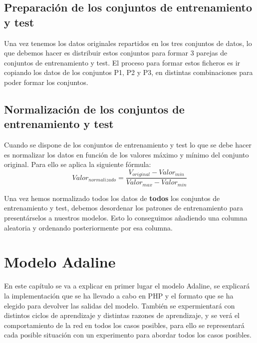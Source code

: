 \documentclass[11pt,spanish,listoffigures,listoftables]{workluis}
\begin{document}
\section{Preparación de los conjuntos de entrenamiento y test}

\par Una vez tenemos los datos originales repartidos en los tres conjuntos de datos, lo que debemos hacer es distribuir estos conjuntos para formar 3 parejas de conjuntos de entrenamiento y test. El proceso para formar estos ficheros es ir copiando los datos de los conjuntos P1, P2 y P3, en distintas combinaciones para poder formar los conjuntos.

\section{Normalización de los conjuntos de entrenamiento y test}

\par Cuando se dispone de los conjuntos de entrenamiento y test lo que se debe hacer es normalizar los datos en función de los valores máximo y mínimo del conjunto original. Para ello se aplica la siguiente fórmula:
\begin{equation}\label{eq:ej}
Valor_{normalizado} = \frac{V_{original} - Valor_{min}}{Valor_{max} - Valor_{min}}
\end{equation}

\par Una vez hemos normalizado todos los datos de \textbf{todos} los conjuntos de entrenamiento y test, debemos desordenar los patrones de entrenamiento para presentárselos a nuestros modelos. Esto lo conseguimos añadiendo una columna aleatoria y ordenando posteriormente por esa columna.

\chapter{Modelo Adaline}

\par En este capítulo se va a explicar en primer lugar el modelo Adaline, se explicará la implementación que se ha llevado a cabo en PHP y el formato que se ha elegido para devolver las salidas del modelo. También se expermientará con distintos ciclos de aprendizaje y distintas razones de aprendizaje, y se verá el comportamiento de la red en todos los casos posibles, para ello se representará cada posible situación con un experimento para abordar todos los casos posibles.
\end{document}
